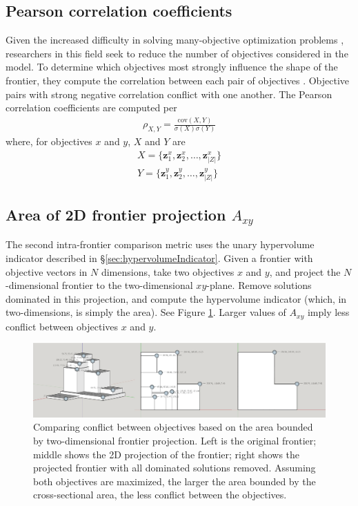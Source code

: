 \subsection{Pearson correlation coefficients} Given the increased difficulty in solving many-objective optimization problems \cite{khare2003performance}, researchers in this field seek to reduce the number of objectives considered in the model. To determine which objectives most strongly influence the shape of the frontier, they compute the correlation between each pair of objectives \cite{deb2005finding}. Objective pairs with strong negative correlation conflict with one another. The Pearson correlation coefficients are computed per
\begin{align}
\rho_{X,Y} = \frac{\text{cov}(X,Y)}{\sigma(X)\sigma(Y)}
\end{align}
where, for objectives $x$ and $y$, $X$ and $Y$ are
\begin{align}
X = \{ \mathbf{z}^x_1, \mathbf{z}^x_2, \ldots, \mathbf{z}^x_{|Z|} \} \\
Y = \{ \mathbf{z}^y_1, \mathbf{z}^y_2, \ldots, \mathbf{z}^y_{|Z|} \}
\end{align}

\subsection{Area of 2D frontier projection $A_{xy}$}
The second intra-frontier comparison metric uses the unary hypervolume indicator described in \S \ref{sec:hypervolumeIndicator}. Given a frontier with objective vectors in $N$ dimensions, take two objectives $x$ and $y$, and project the $N$-dimensional frontier to the two-dimensional $xy$-plane. Remove solutions dominated in this projection, and compute the hypervolume indicator (which, in two-dimensions, is simply the area). See Figure \ref{fig:frontierCrossSection}. Larger values of $A_{xy}$ imply less conflict between objectives $x$ and $y$.

\begin{figure}[ht]
\centering
\includegraphics[width=\textwidth]{../images/CrossSection2D}
\caption[Area of 2D frontier projection]{Comparing conflict between objectives based on the area bounded by two-dimensional frontier projection. Left is the original frontier; middle shows the 2D projection of the frontier; right shows the projected frontier with all dominated solutions removed. Assuming both objectives are maximized, the larger the area bounded by the cross-sectional area, the less conflict between the objectives.}
\label{fig:frontierCrossSection}
\end{figure}